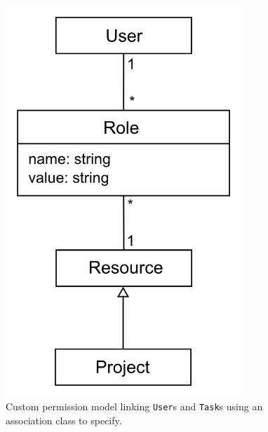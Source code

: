 \documentclass[document.tex]{subfiles}
\begin{document}
\begin{figure}[!ht]
\centering
\includegraphics[width=3.5in]{./img/case-study-research-railgun/permission-data-model}
\cprotect\caption{Custom permission model linking \verb!User!s and \verb!Task!s using an association class to specify.}
\label{fig:case-research-sane-permission-data-model}
\end{figure}

\end{document}
